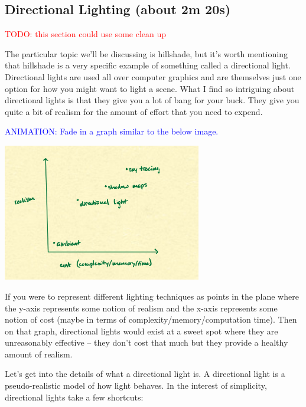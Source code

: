 \documentclass{article}
\newcommand\todo[1]{\textcolor{red}{TODO: #1}}
\newcommand\animation[1]{\textcolor{blue}{ANIMATION: #1}}
\begin{document}
\subsection{Directional Lighting (about 2m 20s)}

\todo{this section could use some clean up}

The particular topic we'll be discussing is hillshade, but it's worth mentioning that hillshade is a very specific example of something called a directional light.
Directional lights are used all over computer graphics and are themselves just one option for how you might want to light a scene.
What I find so intriguing about directional lights is that they give you a lot of bang for your buck.
They give you quite a bit of realism for the amount of effort that you need to expend.

\animation{Fade in a graph similar to the below image.}

\begin{center}
	\includegraphics[width=0.65\textwidth,frame]{assets/realism.jpg}
\end{center}

If you were to represent different lighting techniques as points in the plane where the y-axis represents some notion of realism and the x-axis represents some notion of cost (maybe in terms of complexity/memory/computation time).
Then on that graph, directional lights would exist at a sweet spot where they are unreasonably effective -- they don't cost that much but they provide a healthy amount of realism.

Let's get into the details of what a directional light is.
A directional light is a pseudo-realistic model of how light behaves.
In the interest of simplicity, directional lights take a few shortcuts:
\end{document}
